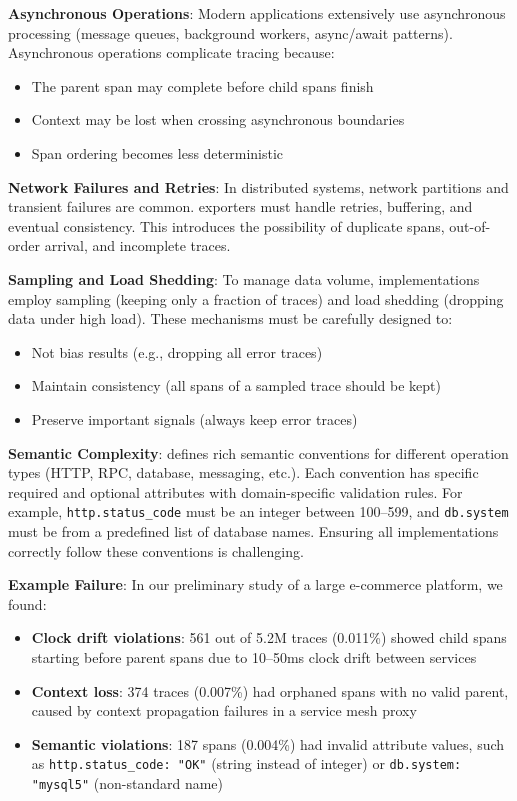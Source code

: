 \textbf{Asynchronous Operations}: Modern applications extensively use asynchronous processing (message queues, background workers, async/await patterns). Asynchronous operations complicate tracing because:
\begin{itemize}
\item The parent span may complete before child spans finish
\item Context may be lost when crossing asynchronous boundaries
\item Span ordering becomes less deterministic
\end{itemize}

\textbf{Network Failures and Retries}: In distributed systems, network partitions and transient failures are common. \otlp exporters must handle retries, buffering, and eventual consistency. This introduces the possibility of duplicate spans, out-of-order arrival, and incomplete traces.

\textbf{Sampling and Load Shedding}: To manage data volume, \otlp implementations employ sampling (keeping only a fraction of traces) and load shedding (dropping data under high load). These mechanisms must be carefully designed to:
\begin{itemize}
\item Not bias results (e.g., dropping all error traces)
\item Maintain consistency (all spans of a sampled trace should be kept)
\item Preserve important signals (always keep error traces)
\end{itemize}

\textbf{Semantic Complexity}: \otlp defines rich semantic conventions for different operation types (HTTP, RPC, database, messaging, etc.). Each convention has specific required and optional attributes with domain-specific validation rules. For example, \texttt{http.status\_code} must be an integer between 100--599, and \texttt{db.system} must be from a predefined list of database names. Ensuring all implementations correctly follow these conventions is challenging.

\textbf{Example Failure}: In our preliminary study of a large e-commerce platform, we found:
\begin{itemize}
\item \textbf{Clock drift violations}: 561 out of 5.2M traces (0.011\%) showed child spans starting before parent spans due to 10--50ms clock drift between services
\item \textbf{Context loss}: 374 traces (0.007\%) had orphaned spans with no valid parent, caused by context propagation failures in a service mesh proxy
\item \textbf{Semantic violations}: 187 spans (0.004\%) had invalid attribute values, such as \texttt{http.status\_code: "OK"} (string instead of integer) or \texttt{db.system: "mysql5"} (non-standard name)
\end{itemize}


